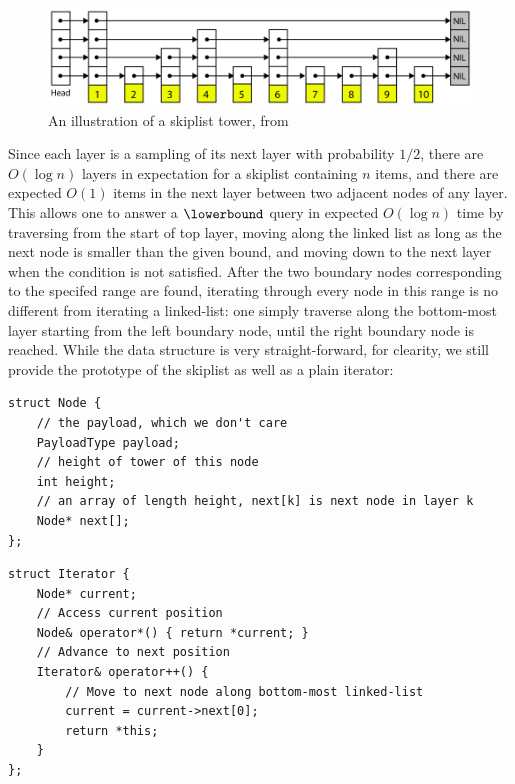 \documentclass[11pt, usletter]{article}
\begin{document}
\begin{figure}[!htb]
  \includegraphics[width=\linewidth]{skiplistTower.png}
\caption{An illustration of a skiplist tower, from \cite{memsqladamblog}}
\label{skiplist_tower}
\end{figure}

Since each layer is a sampling of its next layer with probability $1/2$, 
there are $O(\log n)$ layers in expectation for a skiplist containing $n$ items, 
and there are expected $O(1)$ items in the next layer between two adjacent nodes of any layer. 
This allows one to answer a $\lowerbound$ query in expected $O(\log n)$ time by traversing from the start of top layer, 
moving along the linked list as long as the next node is smaller than the given bound, 
and moving down to the next layer when the condition is not satisfied. 
After the two boundary nodes corresponding to the specifed range are found, 
iterating through every node in this range is no different from iterating a linked-list: 
one simply traverse along the bottom-most layer starting from the left boundary node, until the right boundary node is reached.
While the data structure is very straight-forward, for clearity, 
we still provide the prototype of the skiplist as well as a plain iterator:

\singlespacing\begin{codebox}
\begin{verbatim}
struct Node {
    // the payload, which we don't care
    PayloadType payload;
    // height of tower of this node 
    int height;	
    // an array of length height, next[k] is next node in layer k
    Node* next[]; 
};
\end{verbatim}
\end{codebox}\doublespacing

\singlespacing\begin{codebox}
\begin{verbatim}
struct Iterator {
    Node* current;
    // Access current position
    Node& operator*() { return *current; }
    // Advance to next position
    Iterator& operator++() { 
        // Move to next node along bottom-most linked-list 
        current = current->next[0]; 
        return *this;
    }
};
\end{verbatim}
\end{codebox}\doublespacing
\end{document}
